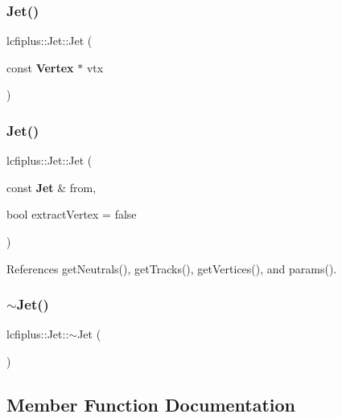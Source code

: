 \mbox{\label{classlcfiplus_1_1Jet_a32146fc642e5b041e40e1c1d9a0c24eb}} 
\subsubsection{Jet()\hspace{0.1cm}{\footnotesize\ttfamily [4/5]}}
{\footnotesize\ttfamily lcfiplus\+::\+Jet\+::\+Jet (\begin{DoxyParamCaption}\item[{const \textbf{ Vertex} $\ast$}]{vtx }\end{DoxyParamCaption})\hspace{0.3cm}{\ttfamily [inline]}}

\mbox{\label{classlcfiplus_1_1Jet_ac5150063880d8f0f055e2828d5b8865d}} 
\subsubsection{Jet()\hspace{0.1cm}{\footnotesize\ttfamily [5/5]}}
{\footnotesize\ttfamily lcfiplus\+::\+Jet\+::\+Jet (\begin{DoxyParamCaption}\item[{const \textbf{ Jet} \&}]{from,  }\item[{bool}]{extract\+Vertex = {\ttfamily false} }\end{DoxyParamCaption})}



References get\+Neutrals(), get\+Tracks(), get\+Vertices(), and params().

\mbox{\label{classlcfiplus_1_1Jet_a8c1bc72baa4f4ee81e562f1d531e007b}} 
\subsubsection{$\sim$\+Jet()}
{\footnotesize\ttfamily lcfiplus\+::\+Jet\+::$\sim$\+Jet (\begin{DoxyParamCaption}{ }\end{DoxyParamCaption})\hspace{0.3cm}{\ttfamily [inline]}}



\subsection{Member Function Documentation}
\mbox{\label{classlcfiplus_1_1Jet_a110d79a192b14781d818fbebb386af44}} 

